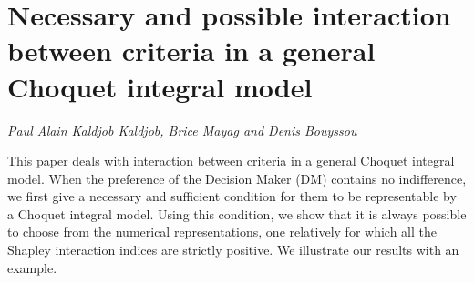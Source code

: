 \documentclass[../booklet.tex]{subfiles}
\begin{document}
\section[Necessary and possible interaction between criteria in a general Choquet integral model. {\it Paul Alain Kaldjob Kaldjob, Brice Mayag and Denis Bouyssou}]{Necessary and possible interaction between criteria in a general Choquet integral model}
  

\begin{center}
  {\it Paul Alain Kaldjob Kaldjob, Brice Mayag and Denis Bouyssou}
\end{center}

\vskip 0.8cm


 This paper deals with interaction  between criteria in a
general Choquet integral model. When the preference of the Decision
Maker (DM) contains no indifference, we first give a necessary and
sufficient condition for them to be representable by a Choquet
integral model. Using this condition, we show that it is always
possible to choose from the numerical representations, one
relatively for which all the Shapley interaction indices are strictly
positive. We illustrate our results with an example.

\end{document}
